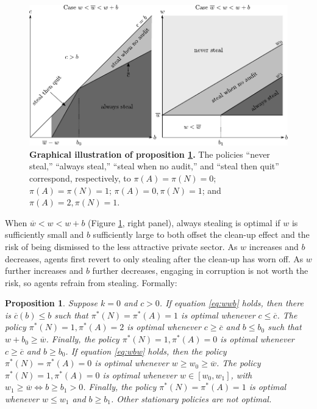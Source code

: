 \documentclass[12pt,a4paper]{article}
\newtheorem{proposition}{Proposition}
\theoremstyle{definition}
\newcommand{\wb}{\overline{w}}
\begin{document}
{\begin{figure}[H]
    \centering
    \includegraphics{figures_theory/eq_with_c.pdf}
    \caption{{\bf Graphical illustration of proposition \ref{prop:eqC}.} The policies ``never steal,'' ``always steal,'' ``steal when no audit,'' and ``steal then quit'' correspond, respectively, to $\pi(A) = \pi(N) = 0$; $\pi(A) = \pi(N) = 1$; $\pi(A) = 0, \pi(N) = 1$;  and $\pi(A) = 2, \pi(N) = 1$.}
    \label{fig:eqC}
\end{figure}

When $\wb < w < w+b$ (Figure \ref{fig:eqC}, right panel), always stealing is optimal if $w$ is sufficiently small and $b$ sufficiently large to both offset the clean-up effect and the risk of being dismissed to the less attractive private sector. As $w$ increases and $b$ decreases, agents first revert to only stealing after the clean-up has worn off. As $w$ further increases and $b$ further decreases, engaging in corruption is not worth the risk, so agents refrain from stealing. Formally:  

\begin{proposition}
    \label{prop:eqC}
    Suppose $k = 0$ and $c > 0$. If equation \ref{eq:wwb} holds, then there is $\overline{c}(b) \leq b$ such that $\pi^*(N)=\pi^*(A)=1$ is optimal whenever $c \leq \overline{c}$. The policy $\pi^*(N)=1, \pi^*(A)=2$ is optimal whenever $c \geq \overline{c}$ and $b \leq b_0$ such that $w+b_0 \geq \wb$. Finally, the policy $\pi^*(N)=1, \pi^*(A)=0$ is optimal whenever $c \geq \overline{c}$ and $b \geq b_0$. If equation \ref{eq:wbw} holds, then the policy $\pi^*(N)=\pi^*(A)=0$ is optimal whenever $w \geq w_0 \geq \wb$. The policy $\pi^*(N)=1, \pi^*(A)=0$ is optimal whenever $w \in [w_0,w_1]$, with $w_1 \geq \wb \iff b \geq b_1 > 0$. Finally, the policy $\pi^*(N)=\pi^*(A)=1$ is optimal whenever $w \leq w_1$ and $b \geq b_1$. Other stationary policies are not optimal. 
\end{proposition}

}
\end{document}
